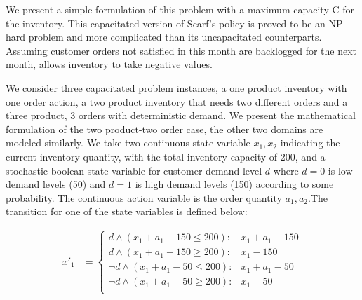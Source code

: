 
We present a simple formulation of this problem with a maximum capacity C for the inventory. This capacitated version of Scarf's policy is proved to be an NP-hard problem \cite{bitran} and more complicated than its uncapacitated counterparts. Assuming customer orders not satisfied in this month are backlogged for the next month, allows inventory to take negative values. 

We consider three capacitated problem instances, a one product inventory with one order action, a two product inventory that needs two different orders and a three product, 3 orders with deterministic demand.
We present the mathematical formulation of the two product-two order case, the other two domains are modeled similarly. We take two continuous state variable $x_1,x_2$ indicating the current inventory quantity, with the total inventory capacity of 200, and a stochastic boolean state variable for customer demand level $d$ where $d=0$ is low demand levels (50) and $d=1$ is high demand levels (150) according to some probability. The continuous action variable is the order quantity $a_1,a_2$.The transition for one of the state variables is defined below:
 
{\footnotesize
\begin{align*}
x'_1 & = \begin{cases}
d \wedge (x_1 + a_1 - 150 \leq 200) : & x_1 + a_1 - 150 \\
d \wedge (x_1 + a_1 - 150 \geq 200) : & x_1 - 150 \\
\neg d \wedge (x_1 + a_1 - 50 \leq 200): & x_1 + a_1 - 50 \\
\neg d \wedge (x_1 + a_1 - 50 \geq 200): & x_1 - 50 \\
\end{cases}
\end{align*}}

